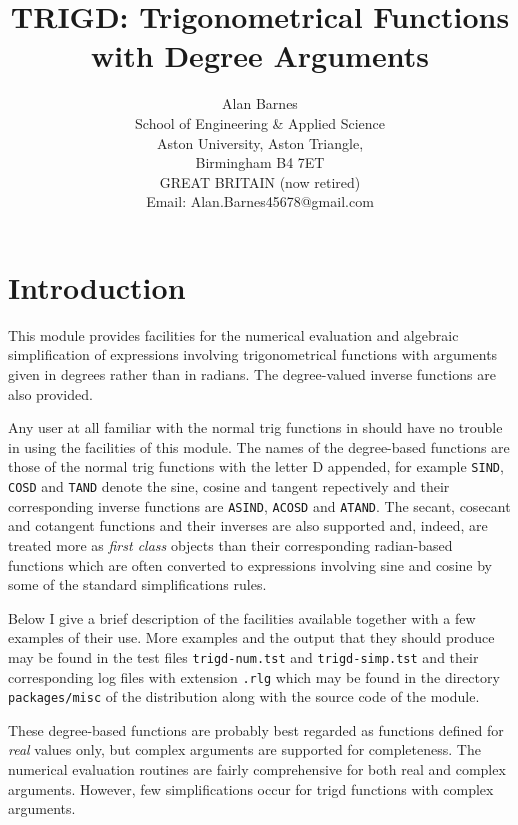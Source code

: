 \title{TRIGD: Trigonometrical Functions\\ with Degree Arguments }
\date{}
\author{Alan Barnes \\
School of Engineering \& Applied Science  \\
Aston University, Aston Triangle, \\
Birmingham B4 7ET \\ GREAT BRITAIN  (now retired)\\
Email: Alan.Barnes45678@gmail.com}


\maketitle
{} 
\section{Introduction}
This module provides facilities for the numerical evaluation and algebraic simplification of expressions involving  trigonometrical functions with arguments given in degrees rather than in radians.  The degree-valued inverse functions are also provided.  

Any user at all familiar with the normal trig functions in {\REDUCE} should have no trouble in using the facilities of this module.  The names of the degree-based functions are those of the normal trig functions with the letter D appended, for example \texttt{SIND}, \texttt{COSD} and \texttt{TAND} denote the sine, cosine and tangent repectively and their corresponding inverse functions are \texttt{ASIND}, \texttt{ACOSD} and \texttt{ATAND}.  The secant, cosecant and cotangent functions and their inverses are also supported and, indeed, are treated more as {\it first class} objects than their corresponding radian-based functions which are often converted to expressions involving sine and cosine by some of the standard {\REDUCE} simplifications rules.   

Below I give a brief description of the facilities available together with a few examples of their use.  More examples and the output that they should produce may be found in the test files \texttt{trigd-num.tst} and \texttt{trigd-simp.tst} and their corresponding log files with extension \texttt{.rlg} which may be found in the directory \texttt{packages/misc} of the {\REDUCE} distribution along with the source code of the module.

These degree-based functions are probably best regarded as functions defined for {\em real} values only, but  complex arguments  are supported for completeness.  The numerical evaluation routines are fairly comprehensive for both real and complex arguments.
However, few simplifications occur for trigd functions with complex arguments.

